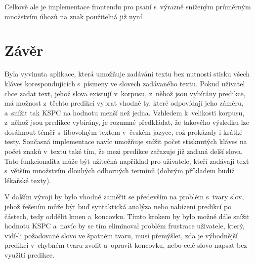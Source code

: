 \documentclass[a4paper,11pt,openany]{book} %
\begin{document}
Celkově ale je implementace frontendu pro psaní s~výrazně sníženým průměrným množstvím úhozů na znak použitelná již nyní.

\clearpage

\chapter*{Závěr}

Byla vyvinuta aplikace, která umožňuje zadávání textu bez nutnosti stisku všech kláves korespondujících s~písmeny ve slovech zadávaného textu. Pokud uživatel chce zadat text, jehož slova existují v~korpusu, z~něhož jsou vybírány predikce, má možnost z~těchto predikcí vybrat vhodně ty, které odpovídají jeho záměru, a~snížit tak KSPC na hodnotu menší než jedna. Vzhledem k~velikosti korpusu, z~něhož jsou predikce vybírány, je rozumné předkládat, že takového výsledku lze dosáhnout téměř s~libovolným textem v~českém jazyce, což prokázaly i krátké testy. Současná implementace navíc umožňuje snížit počet stisknutých kláves na počet znaků v~textu také tím, že mezi predikce zařazuje již zadaná delší slova. Tato funkcionalita může být užitečná například pro uživatele, kteří zadávají text s~větším množstvím dlouhých odborných termínů (dobrým příkladem budiž lékařské texty).

V dalším vývoji by bylo vhodné zaměřit se především na problém s~tvary slov, jehož řešením může být buď syntaktická analýza nebo nabízení predikcí po částech, tedy oddělit kmen a~koncovku. Tímto krokem by bylo možné dále snížit hodnotu KSPC a~navíc by se tím eliminoval problém frustrace uživatele, který, vidí-li požadované slovo ve špatném tvaru, musí přemýšlet, zda je výhodnější predikci v~chybném tvaru zvolit a~opravit koncovku, nebo celé slovo napsat bez využití predikce. 

\clearpage

\pagestyle{plain}

\printbibliography[title={Seznam literatury}]
\end{document}
